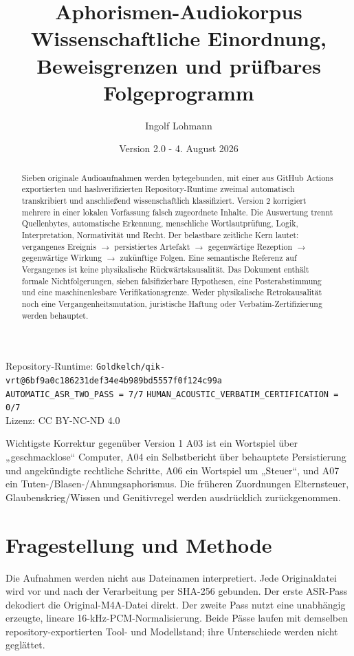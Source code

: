 \documentclass[11pt,a4paper]{article}
\title{\sffamily\bfseries\Huge Aphorismen-Audiokorpus\\[0.3em]\Large Wissenschaftliche Einordnung, Beweisgrenzen und prüfbares Folgeprogramm}
\author{Ingolf Lohmann}
\date{Version 2.0 - 4. August 2026}
\newcommand{\status}[1]{\texttt{#1}}
\begin{document}
\maketitle
\begin{center}
\small Repository-Runtime: \status{Goldkelch/qik-vrt@6bf9a0c186231def34e4b989bd5557f0f124c99a}\\
\status{AUTOMATIC\_ASR\_TWO\_PASS = 7/7} \quad
\status{HUMAN\_ACOUSTIC\_VERBATIM\_CERTIFICATION = 0/7}\\
Lizenz: CC BY-NC-ND 4.0
\end{center}

\begin{abstract}
Sieben originale Audioaufnahmen werden bytegebunden, mit einer aus GitHub Actions exportierten und hashverifizierten Repository-Runtime zweimal automatisch transkribiert und anschließend wissenschaftlich klassifiziert. Version 2 korrigiert mehrere in einer lokalen Vorfassung falsch zugeordnete Inhalte. Die Auswertung trennt Quellenbytes, automatische Erkennung, menschliche Wortlautprüfung, Logik, Interpretation, Normativität und Recht. Der belastbare zeitliche Kern lautet: vergangenes Ereignis $\rightarrow$ persistiertes Artefakt $\rightarrow$ gegenwärtige Rezeption $\rightarrow$ gegenwärtige Wirkung $\rightarrow$ zukünftige Folgen. Eine semantische Referenz auf Vergangenes ist keine physikalische Rückwärtskausalität. Das Dokument enthält formale Nichtfolgerungen, sieben falsifizierbare Hypothesen, eine Posterabstimmung und eine maschinenlesbare Verifikationsgrenze. Weder physikalische Retrokausalität noch eine Vergangenheitsmutation, juristische Haftung oder Verbatim-Zertifizierung werden behauptet.
\end{abstract}

\begin{boundarybox}{Wichtigste Korrektur gegenüber Version 1}
A03 ist ein Wortspiel über „geschmacklose“ Computer, A04 ein Selbstbericht über behauptete Persistierung und angekündigte rechtliche Schritte, A06 ein Wortspiel um „Steuer“, und A07 ein Tuten-/Blasen-/Ahnungsaphorismus. Die früheren Zuordnungen Elternsteuer, Glaubenskrieg/Wissen und Genitivregel werden ausdrücklich zurückgenommen.
\end{boundarybox}

\tableofcontents
\newpage

\section{Fragestellung und Methode}
Die Aufnahmen werden nicht aus Dateinamen interpretiert. Jede Originaldatei wird vor und nach der Verarbeitung per SHA-256 gebunden. Der erste ASR-Pass dekodiert die Original-M4A-Datei direkt. Der zweite Pass nutzt eine unabhängig erzeugte, lineare 16-kHz-PCM-Normalisierung. Beide Pässe laufen mit demselben repository-exportierten Tool- und Modellstand; ihre Unterschiede werden nicht geglättet.
\end{document}
